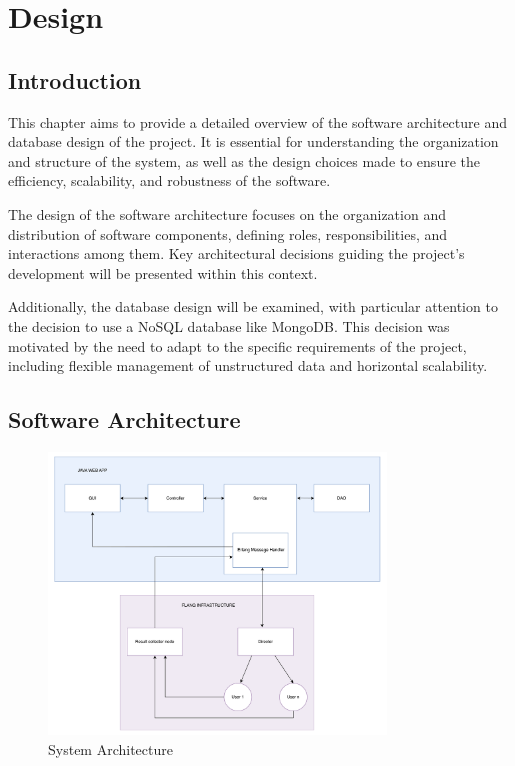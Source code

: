 \chapter{Design}

\section{Introduction}
This chapter aims to provide a detailed overview of the software architecture and database design of the project. It is essential for understanding the organization and structure of the system, as well as the design choices made to ensure the efficiency, scalability, and robustness of the software.

The design of the software architecture focuses on the organization and distribution of software components, defining roles, responsibilities, and interactions among them. Key architectural decisions guiding the project's development will be presented within this context.

Additionally, the database design will be examined, with particular attention to the decision to use a NoSQL database like MongoDB. This decision was motivated by the need to adapt to the specific requirements of the project, including flexible management of unstructured data and horizontal scalability.


\section{Software Architecture}

\begin{figure}[ht!]
    \centering
    \includegraphics[width=0.8\textwidth]{images/2_analisys/FL_proj_Arch..png}
    \caption{System Architecture}
    \label{fig:system_architecture}
\end{figure}


